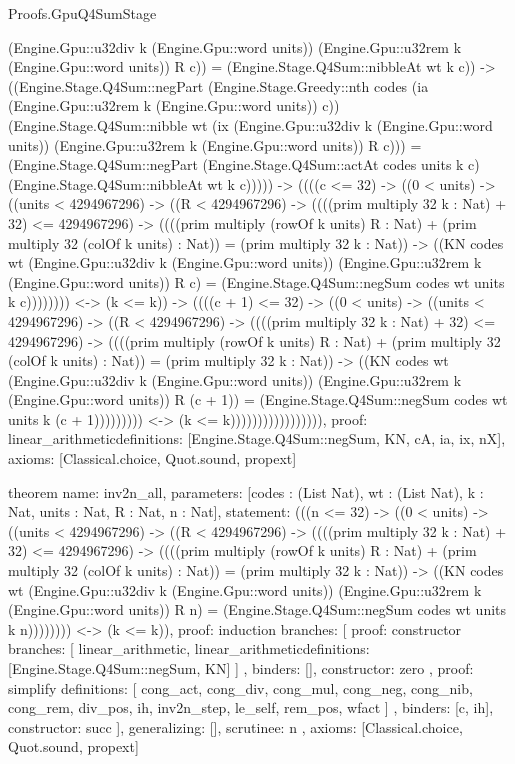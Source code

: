 \begin{lexlean}{Proofs.GpuQ4SumStage}
\begin{semanticmodule}
{(Engine.Gpu::u32div k (Engine.Gpu::word units)) (Engine.Gpu::u32rem k (Engine.Gpu::word units)) R c)) = (Engine.Stage.Q4Sum::nibbleAt wt k c)) -> ((Engine.Stage.Q4Sum::negPart (Engine.Stage.Greedy::nth codes (ia (Engine.Gpu::u32rem k (Engine.Gpu::word units)) c)) (Engine.Stage.Q4Sum::nibble wt (ix (Engine.Gpu::u32div k (Engine.Gpu::word units)) (Engine.Gpu::u32rem k (Engine.Gpu::word units)) R c))) = (Engine.Stage.Q4Sum::negPart (Engine.Stage.Q4Sum::actAt codes units k c) (Engine.Stage.Q4Sum::nibbleAt wt k c))))) -> ((((c <= 32) -> ((0 < units) -> ((units < 4294967296) -> ((R < 4294967296) -> ((((prim multiply 32 k : Nat) + 32) <= 4294967296) -> ((((prim multiply (rowOf k units) R : Nat) + (prim multiply 32 (colOf k units) : Nat)) = (prim multiply 32 k : Nat)) -> ((KN codes wt (Engine.Gpu::u32div k (Engine.Gpu::word units)) (Engine.Gpu::u32rem k (Engine.Gpu::word units)) R c) = (Engine.Stage.Q4Sum::negSum codes wt units k c)))))))) <-> (k <= k)) -> ((((c + 1) <= 32) -> ((0 < units) -> ((units < 4294967296) -> ((R < 4294967296) -> ((((prim multiply 32 k : Nat) + 32) <= 4294967296) -> ((((prim multiply (rowOf k units) R : Nat) + (prim multiply 32 (colOf k units) : Nat)) = (prim multiply 32 k : Nat)) -> ((KN codes wt (Engine.Gpu::u32div k (Engine.Gpu::word units)) (Engine.Gpu::u32rem k (Engine.Gpu::word units)) R (c + 1)) = (Engine.Stage.Q4Sum::negSum codes wt units k (c + 1))))))))) <-> (k <= k))))))))))))))))),
  proof: linear_arithmetic{definitions: [Engine.Stage.Q4Sum::negSum, KN, cA, ia, ix, nX]},
  axioms: [Classical.choice, Quot.sound, propext]
}

theorem{
  name: inv2n_all,
  parameters: [codes : (List Nat), wt : (List Nat), k : Nat, units : Nat, R : Nat, n : Nat],
  statement: (((n <= 32) -> ((0 < units) -> ((units < 4294967296) -> ((R < 4294967296) -> ((((prim multiply 32 k : Nat) + 32) <= 4294967296) -> ((((prim multiply (rowOf k units) R : Nat) + (prim multiply 32 (colOf k units) : Nat)) = (prim multiply 32 k : Nat)) -> ((KN codes wt (Engine.Gpu::u32div k (Engine.Gpu::word units)) (Engine.Gpu::u32rem k (Engine.Gpu::word units)) R n) = (Engine.Stage.Q4Sum::negSum codes wt units k n)))))))) <-> (k <= k)),
  proof: induction{
    branches: [
      {
        proof: constructor{
          branches: [
            linear_arithmetic{},
            linear_arithmetic{definitions: [Engine.Stage.Q4Sum::negSum, KN]}
          ]
        },
        binders: [],
        constructor: zero
      },
      {
        proof: simplify{
          definitions: [
            cong_act,
            cong_div,
            cong_mul,
            cong_neg,
            cong_nib,
            cong_rem,
            div_pos,
            ih,
            inv2n_step,
            le_self,
            rem_pos,
            wfact
          ]
        },
        binders: [c, ih],
        constructor: succ
      }
    ],
    generalizing: [],
    scrutinee: n
  },
  axioms: [Classical.choice, Quot.sound, propext]
}
\end{semanticmodule}
\end{lexlean}
